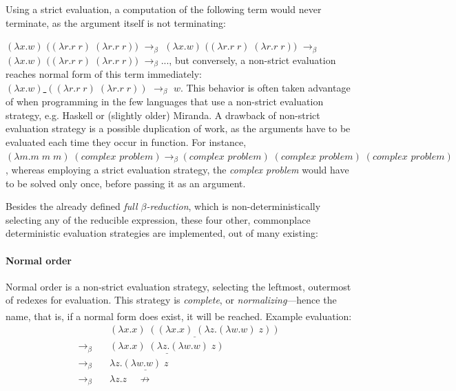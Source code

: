 \documentclass[table, a4paper, 10pt]{book}
\newcommand{\cit}[1]{\textsuperscript{\cite{#1}}}
\begin{document}
Using a strict evaluation, a computation of the following term would never terminate,
as the argument itself is not terminating:

\noindent
{\small
$(\lambda x.w)$ $($\underline{$(\lambda r. r\;r)\;(\lambda r.r\;r)$}$)$ $\to_\beta$
$(\lambda x.w)$ $($\underline{$(\lambda r. r\;r)\;(\lambda r.r\;r)$}$)$ $\to_\beta$
$(\lambda x.w)$ $($\underline{$(\lambda r. r\;r)\;(\lambda r.r\;r)$}$)$ $\to_\beta ...$},
but conversely, a non-strict evaluation reaches normal form of this term immediately:\\
{\small\underline{$(\lambda x.w)$ $((\lambda r. r\;r)\;(\lambda r.r\;r))$} $\to_\beta$ $w$}.
This behavior is often taken advantage of when programming in the few languages that use a non-strict
evaluation strategy, e.g. Haskell or (slightly older) Miranda.
A drawback of non-strict evaluation strategy is a possible duplication
of work, as the arguments have to be evaluated each time they occur in function.
For instance,
{\small$(\lambda m.m\;m\;m)\;(\textit{complex problem}) \to_\beta (\textit{complex problem})\;(\textit{complex problem})\;(\textit{complex problem})$},
whereas employing a strict evaluation strategy, the \textit{complex problem} would have to be solved only once,
before passing it as an argument.

Besides the already defined \textit{full $\beta$-reduction}, which is
non-deterministically selecting any of the reducible expression,
these four other, commonplace deterministic evaluation strategies are implemented, out of many existing:

\paragraph{Normal order} Normal order is a non-strict evaluation strategy,
selecting the leftmost, outermost of redexes for evaluation. This strategy
is \textit{complete}, or \textit{normalizing}---hence the name,
that is, if a normal form does exist, it will be reached.\cit{baren94}
Example evaluation:
\begin{align*}
&\underline{(\lambda x.x)\;((\lambda x.x)\;(\lambda z.(\lambda w.w)\;z))}\\
\to_\beta\quad&\underline{(\lambda x.x)\;(\lambda z.(\lambda w.w)\;z)}\\
\to_\beta\quad&\lambda z.\underline{(\lambda w.w)\;z}\\
\to_\beta\quad&\lambda z.z \;\;\;\;\not\to
\end{align*}
\end{document}
